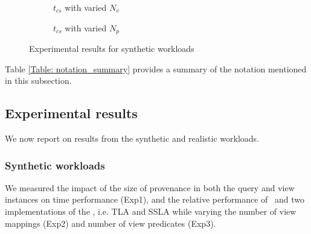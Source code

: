 \begin{figure}
\begin{subfigure}{0.30\textwidth}
        \caption{$t_{cs}$ with varied $N_v$}
        \label{fig:stress_test_view_num}
    \end{subfigure}
    \hfill
    \begin{subfigure}{0.30\textwidth}
    \hspace*{-0.8cm}
        \caption{$t_{cs}$ with varied $N_p$}
        \label{fig:stress_test_predicate_num_time}
    \end{subfigure}
    \caption{Experimental results for synthetic workloads}
\end{figure}

Table \ref{Table: notation_summary} provides a summary of the notation mentioned in this subsection.%

\subsection{Experimental results}
We now report on results from the synthetic and realistic workloads.

\subsubsection{Synthetic workloads} \label{sec: synthetic_exp}
We measured the impact of the size of provenance in both the query and view instances on time performance (Exp1), and the relative performance of \provalg\ and two implementations of the \rba, i.e. TLA and SSLA while varying the number of view mappings (Exp2) and number of view predicates (Exp3).

